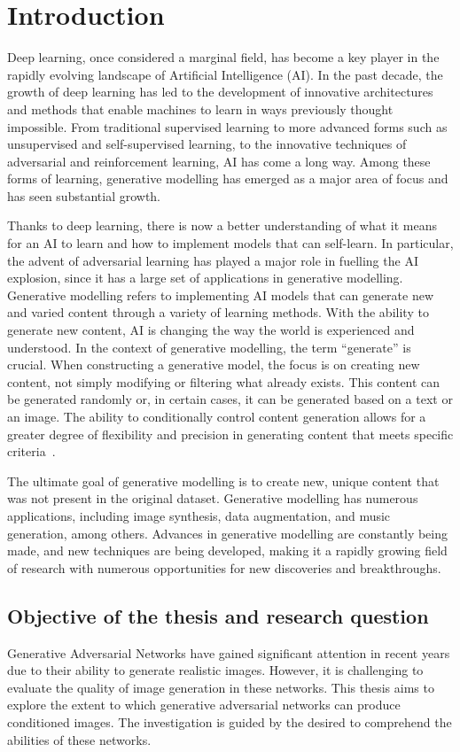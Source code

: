 \section{Introduction}
\label{section:IntroductionChapter}
Deep learning, once considered a marginal field, has become a key player in the rapidly evolving landscape of Artificial Intelligence (AI). In the past decade, the growth of deep learning has led to the development of innovative architectures and methods that enable machines to learn in ways previously thought impossible. From traditional supervised learning to more advanced forms such as unsupervised and self-supervised learning, to the innovative techniques of adversarial and reinforcement learning, AI has come a long way. 
Among these forms of learning, generative modelling has emerged as a major area of focus and has seen substantial growth. 

\noindent Thanks to deep learning, there is now a better understanding of what it means for an AI to learn and how to implement models that can self-learn. 
In particular, the advent of adversarial learning has played a major role in fuelling the AI explosion, since it has a large set of applications in generative modelling. 
Generative modelling refers to implementing AI models that can generate new and varied content through a variety of learning methods. With the ability to generate new content, AI is changing the way the world is experienced and understood. In the context of generative modelling, the term “generate” is crucial. When constructing a generative model, the focus is on creating new content, not simply modifying or filtering what already exists. 
This content can be generated randomly or, in certain cases, it can be generated based on a text or an image. The ability to conditionally control content generation allows for a greater degree of flexibility and precision in generating content that meets specific criteria~\cite{GeneratingNewRealityBook}.

\noindent The ultimate goal of generative modelling is to create new, unique content that was not present in the original dataset. Generative modelling has numerous applications, including image synthesis, data augmentation, and music generation, among others. Advances in generative modelling are constantly being made, and new techniques are being developed, making it a rapidly growing field of research with numerous opportunities for new discoveries and breakthroughs.

\subsection{Objective of the thesis and research question}
Generative Adversarial Networks have gained significant attention in recent years due to their ability to generate realistic images. However, it is challenging to evaluate the quality of image generation in these networks. This thesis aims to explore the extent to which generative adversarial networks can produce conditioned images. The investigation is guided by the desired to comprehend the abilities of these networks.

